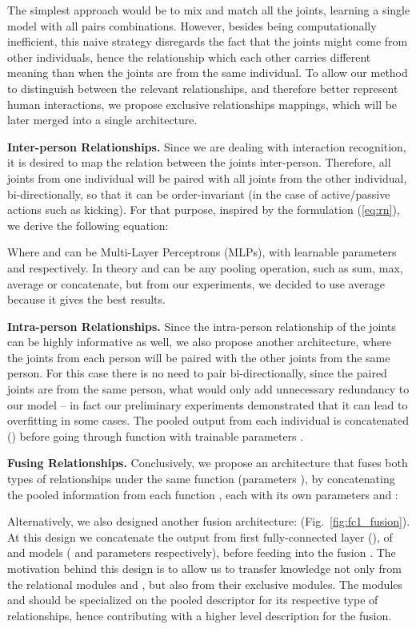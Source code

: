 \documentclass[journal,twoside]{IEEEtran}
\begin{document}
The simplest approach would be to mix and match all the joints, learning a single model with all pairs combinations.
However, besides being computationally inefficient, this naive strategy disregards the fact that the joints might come from other individuals, hence the relationship which each other carries different meaning than when the joints are from the same individual.
To allow our method to distinguish between the relevant relationships, and therefore better represent human interactions, we propose exclusive relationships mappings, which will be later merged into a single architecture.




\textbf{Inter-person Relationships.}
Since we are dealing with interaction recognition, it is desired to map the relation between the joints inter-person.
Therefore, all joints from one individual will be paired with all joints from the other individual, bi-directionally, so that it can be order-invariant (in the case of active/passive actions such as kicking).
For that purpose, inspired by the formulation (\ref{eq:rn}), we derive the following equation:



Where  and  can be Multi-Layer Perceptrons (MLPs), with learnable parameters  and  respectively. In theory  and  can be any pooling operation, such as sum, max, average or concatenate, but from our experiments, we decided to use average because it gives the best results.

\textbf{Intra-person Relationships.}
Since the intra-person relationship of the joints can be highly informative as well, we also propose another architecture, where the joints from each person will be paired with the other joints from the same person. 
For this case there is no need to pair bi-directionally, since the paired joints are from the same person, what would only add unnecessary redundancy to our model -- 
in fact our preliminary experiments demonstrated that it can lead to overfitting in some cases.
The pooled output from each individual is concatenated () before going through 
function  with trainable parameters .




\textbf{Fusing Relationships.}
Conclusively, we propose an architecture that fuses both types of relationships under the same 
function  (parameters ), 
by concatenating the pooled information from each function , each with its own parameters  and :



Alternatively, we also designed another fusion architecture:  (Fig.~\ref{fig:fc1_fusion}).
At this design we concatenate the output from  first fully-connected layer (), of  and  models ( and  parameters respectively), before feeding into the fusion .
The motivation behind this design is to allow us to transfer knowledge not only from the relational modules  and , but also from their exclusive  modules.
The modules  and  should be specialized on the pooled descriptor for its respective type of relationships, hence contributing with a higher level description for the fusion.
\end{document}
